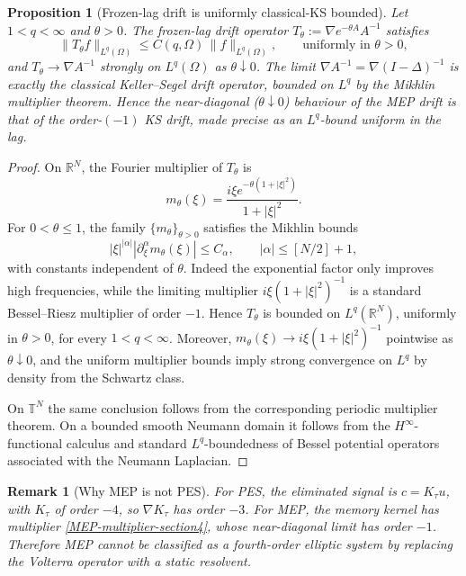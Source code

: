 \documentclass[pdflatex,sn-mathphys-num]{sn-jnl}%
\theoremstyle{thmstyleone}
\newtheorem{proposition}[theorem]{Proposition}%
\theoremstyle{thmstyletwo}
\newtheorem{remark}{Remark}
\theoremstyle{thmstylethree}
\begin{document}
\begin{proposition}[Frozen-lag drift is uniformly classical-KS bounded]
\label{prop:frozen-lag-bound}
Let \(1<q<\infty\) and \(\theta>0\). The frozen-lag drift operator
\(T_\theta:=\nabla e^{-\theta A}A^{-1}\) satisfies
\[
   \|T_\theta f\|_{L^q(\Omega)}\le C(q,\Omega)\,\|f\|_{L^q(\Omega)},
   \qquad\text{uniformly in }\theta>0,
\]
and \(T_\theta\to\nabla A^{-1}\) strongly on \(L^q(\Omega)\) as
\(\theta\downarrow0\). The limit \(\nabla A^{-1}=\nabla(I-\Delta)^{-1}\) is
exactly the classical Keller--Segel drift operator, bounded on \(L^q\) by the
Mikhlin multiplier theorem. Hence the near-diagonal (\(\theta\downarrow0\))
behaviour of the MEP drift is that of the order-\((-1)\) KS drift, made precise
as an \(L^q\)-bound uniform in the lag.
\end{proposition}

\begin{proof}
On \(\mathbb R^N\), the Fourier multiplier of \(T_\theta\) is
\[
        m_\theta(\xi)
        =
        \frac{i\xi e^{-\theta(1+|\xi|^2)}}{1+|\xi|^2}.
\]
For \(0<\theta\le1\), the family \(\{m_\theta\}_{\theta>0}\) satisfies the
Mikhlin bounds
\[
        |\xi|^{|\alpha|}
        |\partial_\xi^\alpha m_\theta(\xi)|
        \le C_\alpha,
        \qquad |\alpha|\le [N/2]+1,
\]
with constants independent of \(\theta\).  Indeed the exponential factor only
improves high frequencies, while the limiting multiplier
\(i\xi(1+|\xi|^2)^{-1}\) is a standard Bessel--Riesz multiplier of order
\(-1\).  Hence \(T_\theta\) is bounded on \(L^q(\mathbb R^N)\), uniformly in
\(\theta>0\), for every \(1<q<\infty\).  Moreover,
\(m_\theta(\xi)\to i\xi(1+|\xi|^2)^{-1}\) pointwise as \(\theta\downarrow0\),
and the uniform multiplier bounds imply strong convergence on \(L^q\) by
density from the Schwartz class.

On \(\mathbb T^N\) the same conclusion follows from the corresponding
periodic multiplier theorem.  On a bounded smooth Neumann domain it follows
from the \(H^\infty\)-functional calculus and standard \(L^q\)-boundedness of
Bessel potential operators associated with the Neumann Laplacian.
\end{proof}

\begin{remark}[Why MEP is not PES]
\label{rem:MEP-not-PES}
For PES, the eliminated signal is \(c=K_\tau u\), with \(K_\tau\) of order
\(-4\), so \(\nabla K_\tau\) has order \(-3\).  For MEP, the memory kernel
has multiplier \eqref{MEP-multiplier-section4}, whose near-diagonal limit has
order \(-1\).  Therefore MEP cannot be classified as a fourth-order elliptic
system by replacing the Volterra operator with a static resolvent.
\end{remark}
\end{document}
